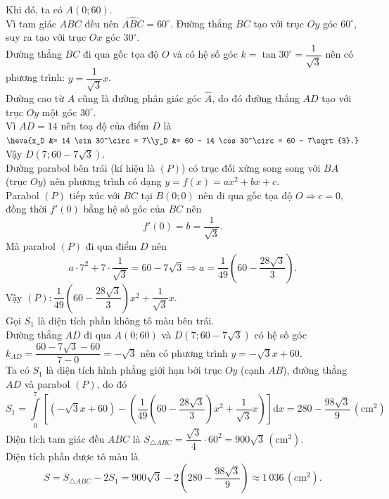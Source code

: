 \begin{ex}
{\begin{center}
		\end{center}
		Khi đó, ta có $A(0; 60)$.\\
		Vì tam giác $ABC$ đều nên $\widehat{ABC} = 60^\circ$. Đường thẳng $BC$ tạo với trục $Oy$ góc $60^\circ$, suy ra tạo với trục $Ox$ góc $30^\circ$. \\
		Đường thẳng $BC$ đi qua gốc tọa độ $O$ và có hệ số góc $k = \tan 30^\circ = \dfrac{1}{\sqrt{3}}$ nên có phương trình: $y = \dfrac{1}{\sqrt{3}}x$.\\
		Đường cao từ $A$ cũng là đường phân giác góc $\widehat{A}$, do đó đường thẳng $AD$ tạo với trục $Oy$ một góc $30^\circ$.\\
		Vì $AD = 14$ nên toạ độ của điểm $D$ là $\heva{x_D &= 14 \sin 30^\circ = 7\\y_D &= 60 - 14 \cos 30^\circ = 60 - 7\sqrt{3}.}$\\
		Vậy $D\left(7; 60 - 7\sqrt{3}\right)$.\\
		Đường parabol bên trái (kí hiệu là $(P)$) có trục đối xứng song song với $BA$ (trục $Oy$) nên phương trình có dạng $y = f(x) = ax^2 + bx + c$.\\
		Parabol $(P)$ tiếp xúc với $BC$ tại $B(0;0)$ nên đi qua gốc tọa độ $O \Rightarrow c = 0$, đồng thời $f'(0)$ bằng hệ số góc của $BC$ nên
		\[ f'(0) = b = \dfrac{1}{\sqrt{3}}. \]
		Mà parabol $(P)$ đi qua điểm $D$ nên
		\[ a \cdot 7^2 + 7 \cdot \dfrac{1}{\sqrt{3}} = 60 - 7\sqrt{3} \Rightarrow a = \dfrac{1}{49}\left(60 - \dfrac{28\sqrt{3}}{3}\right). \]
		Vậy $(P)\colon \dfrac{1}{49}\left(60 - \dfrac{28\sqrt{3}}{3}\right)x^2+ \dfrac{1}{\sqrt{3}}x$.\\
		Gọi $S_1$ là diện tích phần không tô màu bên trái. \\
		Đường thẳng $AD$ đi qua $A(0; 60)$ và $D\left(7; 60 - 7\sqrt{3}\right)$ có hệ số góc $k_{AD} = \dfrac{60 - 7\sqrt{3} - 60}{7 - 0} = -\sqrt{3}$ nên có phương trình $y = -\sqrt{3}x + 60$.\\
		Ta có $S_1$ là diện tích hình phẳng giới hạn bởi trục $Oy$ (cạnh $AB$), đường thẳng $AD$ và parabol $(P)$, do đó
		\[	S_1 = \displaystyle\int\limits_0^7 \left[ \left(-\sqrt{3}x + 60\right) - \left( \dfrac{1}{49}\left(60 - \dfrac{28\sqrt{3}}{3}\right)x^2+ \dfrac{1}{\sqrt{3}}x\right) \right] \mathrm{d}x =280 - \dfrac{98\sqrt{3}}{9}\,\left(\text{cm}^2\right)\]
		Diện tích tam giác đều $ABC$ là $S_{\triangle ABC} = \dfrac{\sqrt{3}}{4} \cdot 60^2 = 900\sqrt{3}\,\left(\text{cm}^2\right)$.\\
		Diện tích phần được tô màu là
		\[S = S_{\triangle ABC} - 2S_1 = 900\sqrt{3} - 2\left( 280 - \dfrac{98\sqrt{3}}{9} \right) \approx 1\,036\,\left(\text{cm}^2\right).\]
	}
\end{ex}

